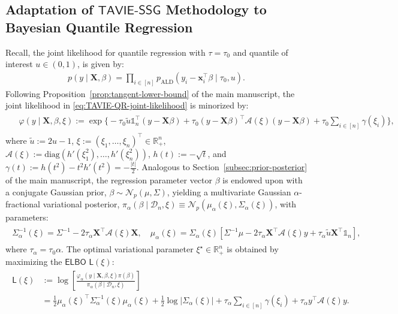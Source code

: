 \documentclass[12pt]{article}
\numberwithin{equation}{section}
\newcommand{\tssg}{\mathsf{TAVIE}\text{-}\mathsf{SSG}}
\begin{document}
\subsection{Adaptation of \texorpdfstring{$\tssg$}{TAVIE-SSG} Methodology to Bayesian Quantile Regression}\label{subsec:TAVIE-BQR-setup}

Recall, the joint likelihood for quantile regression with $\tau = \tau_0$ and quantile of interest $u\in (0, 1)$, is given by:
%
\begin{align}\label{eq:TAVIE-QR-joint-likelihood}
    p(y\mid \mathbf{X}, \beta) = \prod_{i\in [n]}p_{\mathrm{ALD}}(y_i - \mathbf{x}_i^{\top}\beta\mid \tau_0, u).
\end{align}
%
Following Proposition~\ref{prop:tangent-lower-bound} of the main manuscript, the joint likelihood in \eqref{eq:TAVIE-QR-joint-likelihood} is minorized by:
%
\begin{align}
\label{eq:BQR-minorizer}
\begin{split}
    &\varphi(y \mid \mathbf{X}, \beta, \xi) := \exp\Big\{-\tau_0\tilde{u}\mathds{1}_n^{\top}(y - \mathbf{X}\beta) + \tau_0(y - \mathbf{X}\beta)^{\top}\mathcal{A}(\xi)(y - \mathbf{X}\beta) + \tau_0\sum_{i \in [n]}\gamma(\xi_i)\Big\},
\end{split}
\end{align}
%
where $\tilde{u} := 2u-1$, $\xi := (\xi_1,\ldots,\xi_n)^{\top} \in \mathbb{R}^{n}_{+}$, $\mathcal{A}(\xi) := \mathrm{diag}(h'(\xi_1^2),\ldots,h'(\xi_n^2))$, $h(t) := -\sqrt{t}$, and $\gamma(t) := h(t^2) - t^2h'(t^2) = -\tfrac{|t|}{2}$. Analogous to Section~\ref{subsec:prior-posterior} of the main manuscript, the regression parameter vector $\beta$ is endowed upon with a conjugate Gaussian prior, $\beta \sim \mathcal{N}_p(\mu, {\Sigma})$, yielding a multivariate Gaussian $\alpha$-fractional variational posterior, $\pi_{\alpha}(\beta \mid \mathcal{D}_n, \xi) \equiv \mathcal{N}_p(\mu_{\alpha}(\xi), \Sigma_{\alpha}(\xi))$, with parameters:
\begin{align}\label{eq:QR-variational-posterior-parameters}
\begin{split}
    \Sigma_{\alpha}^{-1}(\xi) = \Sigma^{-1} - 2\tau_{\alpha} \mathbf{X}^{\top}\mathcal{A}(\xi)\mathbf{X},\quad \mu_{\alpha}(\xi) = \Sigma_{\alpha}(\xi)\left[\Sigma^{-1}\mu - 2\tau_{\alpha}\mathbf{X}^{\top}\mathcal{A}(\xi)y + \tau_{\alpha} \tilde{u}\mathbf{X}^{\top}\mathds{1}_n\right],
\end{split}
\end{align}
where $\tau_{\alpha} = \tau_0\alpha$. The optimal variational parameter $\xi^{\star} \in \mathbb{R}^{n}_{+}$ is obtained by maximizing the $\mathsf{ELBO}$ $\mathsf{L}(\xi)$:
\begin{align}\label{eq:ELBO-BQR}
\begin{split}
    \mathsf{L}(\xi) &:= \log\left[\frac{\varphi_{\alpha}(y\mid \mathbf{X}, \beta, \xi)\pi(\beta)}{\pi_{\alpha}(\beta\mid \mathcal{D}_n, \xi)}\right] \\&= \frac{1}{2}\mu_{\alpha}(\xi)^{\top}\Sigma^{-1}_{\alpha}(\xi)\mu_{\alpha}(\xi) + \frac{1}{2}\log|\Sigma_{\alpha}(\xi)| + \tau_{\alpha}\sum_{i \in [n]} \gamma(\xi_i) + \tau_{\alpha}y^{\top}\mathcal{A}(\xi)y.
\end{split}
\end{align}
\end{document}

